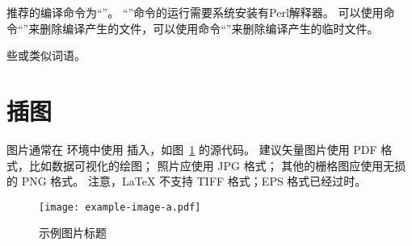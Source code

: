 推荐的编译命令为``''。
``''命令的运行需要系统安装有Perl解释器。
可以使用命令``''来删除编译产生的文件，可以使用命令``''来删除编译产生的临时文件。

些或类似词语。

\section{插图}

图片通常在  环境中使用  插入，如图~\ref{fig:example} 的源代码。
建议矢量图片使用 PDF 格式，比如数据可视化的绘图；
照片应使用 JPG 格式；
其他的栅格图应使用无损的 PNG 格式。
注意，LaTeX 不支持 TIFF 格式；EPS 格式已经过时。

\begin{figure}
    \centering
    \texttt{[image: example-image-a.pdf]}
    \caption{示例图片标题}
    \label{fig:example}
\end{figure}
  